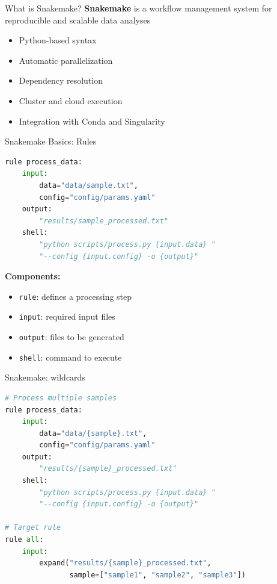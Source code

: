 \documentclass[aspectratio=169]{beamer}
\begin{document}

\begin{frame}{What is Snakemake?}
    \textbf{Snakemake} is a workflow management system for reproducible and scalable data analyses
    
    \vspace{0.5cm}
    \begin{itemize}
        \item Python-based syntax
        \item Automatic parallelization
        \item Dependency resolution
        \item Cluster and cloud execution
        \item Integration with Conda and Singularity
    \end{itemize}
    
\end{frame}

\begin{frame}[fragile]{Snakemake Basics: Rules}
    \begin{lstlisting}[language=Python]
rule process_data:
    input:
        data="data/sample.txt",
        config="config/params.yaml"
    output:
        "results/sample_processed.txt"
    shell:
        "python scripts/process.py {input.data} "
        "--config {input.config} -o {output}"
\end{lstlisting}
    
    \vspace{0.3cm}
    \textbf{Components:}
    \begin{itemize}
        \item \texttt{rule}: defines a processing step
        \item \texttt{input}: required input files
        \item \texttt{output}: files to be generated
        \item \texttt{shell}: command to execute
    \end{itemize}
\end{frame}

\begin{frame}[fragile]{Snakemake: wildcards}
    \begin{lstlisting}[language=Python]
# Process multiple samples
rule process_data:
    input:
        data="data/{sample}.txt",
        config="config/params.yaml"
    output:
        "results/{sample}_processed.txt"
    shell:
        "python scripts/process.py {input.data} "
        "--config {input.config} -o {output}"

# Target rule
rule all:
    input:
        expand("results/{sample}_processed.txt",
               sample=["sample1", "sample2", "sample3"])
\end{lstlisting}
\end{frame}
\end{document}
